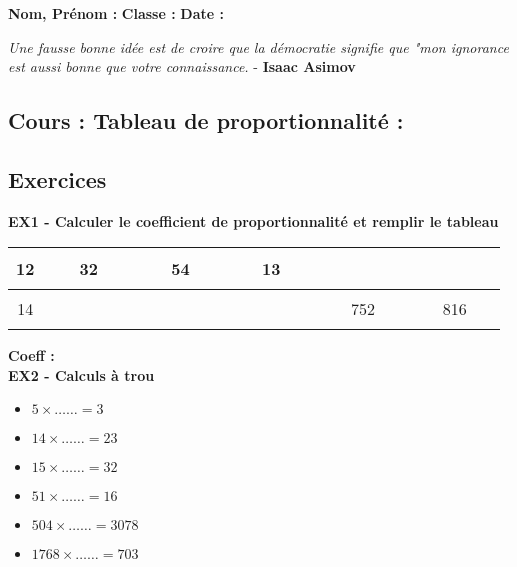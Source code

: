 



\textbf{Nom, Prénom :} \hspace{8cm} \textbf{Classe :} \hspace{3cm} \textbf{Date :}\\

\begin{center}
  \textit{Une fausse bonne idée est de croire que la démocratie signifie que "mon ignorance est aussi bonne que votre connaissance.}  - \textbf{Isaac Asimov}
\end{center}

\subsection*{Cours : Tableau de proportionnalité :}

\Pointilles[3]

\subsection*{Exercices}

\textbf{EX1 - Calculer le coefficient de proportionnalité et remplir le tableau}\\

\begin{center}
  \begin{tabular}{|c|c|c|c|c|c|}
    \hline
    12 & 32                     & 54                     & 13                     & $\phantom{\dfrac{azertyuiop}{1}}$ & $\phantom{azertyuiop}$\\  \hline
    14 & $\phantom{\dfrac{azertyuiop}{1}}$ & $\phantom{azertyuiop}$ & $\phantom{azertyuiop}$ & 752                    &                    816\\  \hline
  \end{tabular}
\end{center}

\textbf{Coeff : }\dotfill \\

\textbf{EX2 - Calculs à trou}\\

\begin{multicols}{3}\noindent
\begin{itemize}[label={$\bullet$}]
  \item $5 \times \ldots \ldots = 3$ \\
  \item $14 \times \ldots \ldots = 23$ \\
  \item $15 \times \ldots \ldots = 32$ \\
  \item $51 \times \ldots \ldots = 16$ \\
  \item $504 \times \ldots \ldots = 3078$ \\
  \item $1768 \times \ldots \ldots = 703$ \\
\end{itemize}
\end{multicols}

